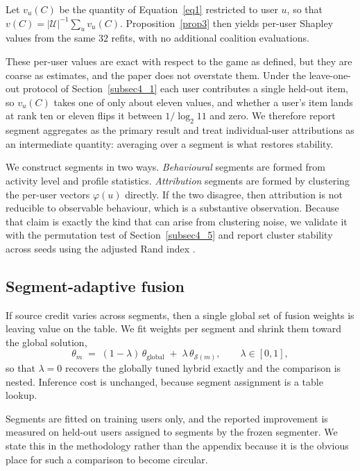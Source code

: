 \documentclass[pdflatex,sn-mathphys-num]{sn-jnl}%
\theoremstyle{thmstyleone}%
\theoremstyle{thmstyletwo}%
\theoremstyle{thmstylethree}%
\newcommand{\Uset}{\mathcal{U}}
\begin{document}
Let $v_u(C)$ be the quantity of Equation~\eqref{eq1} restricted to user $u$, so that $v(C)=|\Uset|^{-1}\sum_u v_u(C)$. Proposition~\ref{prop3} then yields per-user Shapley values from the same $32$ refits, with no additional coalition evaluations.

These per-user values are exact with respect to the game as defined, but they are coarse as estimates, and the paper does not overstate them. Under the leave-one-out protocol of Section~\ref{subsec4_1} each user contributes a single held-out item, so $v_u(C)$ takes one of only about eleven values, and whether a user's item lands at rank ten or eleven flips it between $1/\log_2 11$ and zero. We therefore report segment aggregates as the primary result and treat individual-user attributions as an intermediate quantity: averaging over a segment is what restores stability.

We construct segments in two ways. \emph{Behavioural} segments are formed from activity level and profile statistics. \emph{Attribution} segments are formed by clustering the per-user vectors $\varphi(u)$ directly. If the two disagree, then attribution is not reducible to observable behaviour, which is a substantive observation. Because that claim is exactly the kind that can arise from clustering noise, we validate it with the permutation test of Section~\ref{subsec4_5} and report cluster stability across seeds using the adjusted Rand index \cite{hubert1985}.

\subsection{Segment-adaptive fusion}\label{subsec3_7}

If source credit varies across segments, then a single global set of fusion weights is leaving value on the table. We fit weights per segment and shrink them toward the global solution,
\begin{equation}\label{eq3}
\theta_m \;=\; (1-\lambda)\,\theta_{\text{global}} \;+\; \lambda\,\theta_{\mathcal{S}(m)},
\qquad \lambda\in[0,1],
\end{equation}
so that $\lambda=0$ recovers the globally tuned hybrid exactly and the comparison is nested. Inference cost is unchanged, because segment assignment is a table lookup.

Segments are fitted on training users only, and the reported improvement is measured on held-out users assigned to segments by the frozen segmenter. We state this in the methodology rather than the appendix because it is the obvious place for such a comparison to become circular.
\end{document}
